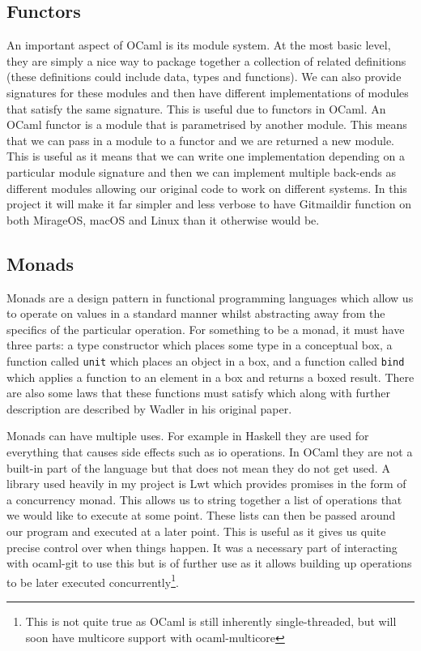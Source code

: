 \subsection{Functors}

An important aspect of OCaml is its module system. At the most basic level, they are simply a nice way to package together a collection of related definitions (these definitions could include data, types and functions). We can also provide signatures for these modules and then have different implementations of modules that satisfy the same signature. This is useful due to functors in OCaml. An OCaml functor is a module that is parametrised by another module. This means that we can pass in a module to a functor and we are returned a new module. This is useful as it means that we can write one implementation depending on a particular module signature and then we can implement multiple back-ends as different modules allowing our original code to work on different systems. In this project it will make it far simpler and less verbose to have Gitmaildir function on both MirageOS, macOS and Linux than it otherwise would be.

\subsection{Monads}

Monads are a design pattern in functional programming languages which allow us to operate on values in a standard manner whilst abstracting away from the specifics of the particular operation. For something to be a monad, it must have three parts: a type constructor which places some type in a conceptual box, a function called \texttt{unit} which places an object in a box, and a function called \texttt{bind} which applies a function to an element in a box and returns a boxed result. There are also some laws that these functions must satisfy which along with further description are described by Wadler in his original paper\cite{wadler90monads}.

Monads can have multiple uses. For example in Haskell they are used for everything that causes side effects such as io operations. In OCaml they are not a built-in part of the language but that does not mean they do not get used. A library used heavily in my project is Lwt\cite{code_lwt} which provides promises in the form of a concurrency monad. This allows us to string together a list of operations that we would like to execute at some point. These lists can then be passed around our program and executed at a later point. This is useful as it gives us quite precise control over when things happen. It was a necessary part of interacting with ocaml-git to use this but is of further use as it allows building up operations to be later executed concurrently\footnote{This is not quite true as OCaml is still inherently single-threaded, but will soon have multicore support with ocaml-multicore\cite{dolan2014multicore}}.


